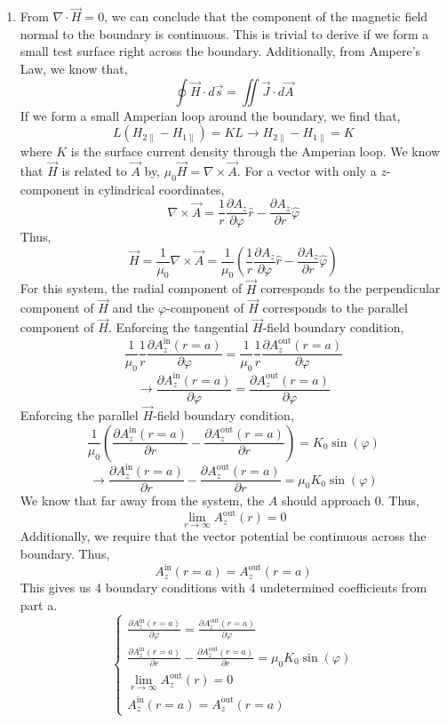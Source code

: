 \documentclass[12pt]{article}
\begin{document}
\begin{enumerate}
\begin{enumerate}
		\item [b.]
		From $\nabla \cdot \vec H=0$, we can conclude that the component of the magnetic field normal to the boundary is continuous.
		This is trivial to derive if we form a small test surface right across the boundary.
		Additionally, from Ampere's Law, we know that,
		\[\oint \vec H \cdot d\vec s = \iint \vec J \cdot d\vec A\]
		If we form a small Amperian loop around the boundary, we find that,
		\[L(H_{2\parallel}-H_{1\parallel})=KL\to H_{2\parallel}-H_{1\parallel}=K\]
		where $K$ is the surface current density through the Amperian loop.
		We know that $\vec H$ is related to $\vec A$ by, $\mu_0 \vec H = \nabla \times \vec A$.
		For a vector with only a $z$-component in cylindrical coordinates,
		\[\nabla \times \vec A = \frac{1}{r}\frac{\partial A_z}{\partial \varphi}\hat r-\frac{\partial A_z}{\partial r}\hat \varphi\]
		Thus,
		\[\vec H =\frac{1}{\mu_0}\nabla \times \vec A = \frac{1}{\mu_0}\left(\frac{1}{r}\frac{\partial A_z}{\partial \varphi}\hat r - \frac{\partial A_z}{\partial r}\hat \varphi\right)\]
		For this system, the radial component of $\vec H$ corresponds to the perpendicular component of $\vec H$ and the $\varphi$-component of $\vec H$ corresponds to the parallel component of $\vec H$.
		Enforcing the tangential $\vec H$-field boundary condition,
		\[\frac{1}{\mu_0}\frac{1}{r}\frac{\partial A_z^{\mathrm{in}}(r=a)}{\partial \varphi}=\frac{1}{\mu_0}\frac{1}{r}\frac{\partial A_z^{\mathrm{out}}(r=a)}{\partial \varphi}\]
		\[\to \frac{\partial A_z^{\mathrm{in}}(r=a)}{\partial \varphi}=\frac{\partial A_z^{\mathrm{out}}(r=a)}{\partial \varphi}\]
		Enforcing the parallel $\vec H$-field boundary condition,
		\[\frac{1}{\mu_0}\left(\frac{\partial A_z^{\mathrm{in}}(r=a)}{\partial r}-\frac{\partial A_z^{\mathrm{out}}(r=a)}{\partial r}\right)=K_0\sin(\varphi)\]
		\[\to \frac{\partial A_z^{\mathrm{in}}(r=a)}{\partial r}-\frac{\partial A_z^{\mathrm{out}}(r=a)}{\partial r}=\mu_0K_0\sin(\varphi)\]
		We know that far away from the system, the $A$ should approach $0$.
		Thus,
		\[\lim_{r\to\infty}A_z^{\mathrm{out}}(r) = 0\]
		Additionally, we require that the vector potential be continuous across the boundary.
		Thus,
		\[A_z^{\mathrm{in}}(r=a)=A_z^{\mathrm{out}}(r=a)\]
		This gives us 4 boundary conditions with 4 undetermined coefficients from part a.
		\[\boxed{\begin{cases}
			\frac{\partial A_z^{\mathrm{in}}(r=a)}{\partial \varphi}=\frac{\partial A_z^{\mathrm{out}}(r=a)}{\partial \varphi} \\ 
			\frac{\partial A_z^{\mathrm{in}}(r=a)}{\partial r}-\frac{\partial A_z^{\mathrm{out}}(r=a)}{\partial r}=\mu_0K_0\sin(\varphi) \\ 
			\lim_{r\to\infty}A_z^{\mathrm{out}}(r) = 0 \\ 
			A_z^{\mathrm{in}}(r=a)=A_z^{\mathrm{out}}(r=a)
		\end{cases}}\]


\end{enumerate}
\end{enumerate}
\end{document}
